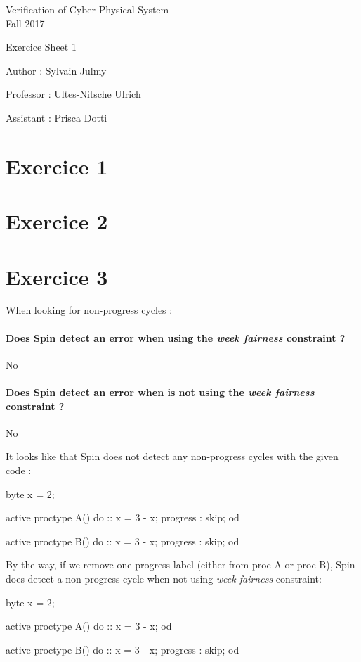 \documentclass[a4paper,11pt]{report}
\author{Sylvain Julmy}
\date{\today}
\begin{document}
\begin{center}
\Large{
    Verification of Cyber-Physical System\\
    Fall 2017
  }
  
  \noindent\makebox[\linewidth]{\rule{\linewidth}{0.4pt}}
  Exercice Sheet 1

  \vspace*{1.4cm}

  Author : Sylvain Julmy
  \noindent\makebox[\linewidth]{\rule{\linewidth}{0.4pt}}

  \begin{flushleft}
    Professor : Ultes-Nitsche Ulrich
    
    Assistant : Prisca Dotti
  \end{flushleft}

  \noindent\makebox[\linewidth]{\rule{\textwidth}{1pt}}
\end{center}

\section*{Exercice 1}
\section*{Exercice 2}
\section*{Exercice 3}

When looking for non-progress cycles :

\paragraph*{Does Spin detect an error when using the \textit{week fairness}
  constraint ?} No

\paragraph*{Does Spin detect an error when is not using the \textit{week
    fairness} constraint ?} No

It looks like that Spin does not detect any non-progress cycles with the given
code :

\begin{promelacode}
byte x = 2;

active proctype A(){
       do
          :: x = 3 - x; progress : skip;
       od
}

active proctype B(){
       do
          :: x = 3 - x; progress : skip;
       od
}
\end{promelacode}

By the way, if we remove one progress label (either from proc A or proc
B), Spin does detect a non-progress cycle when not using \textit{week fairness}
constraint:

\begin{promelacode}
byte x = 2;

active proctype A(){
       do
          :: x = 3 - x;
       od
}

active proctype B(){
       do
          :: x = 3 - x; progress : skip;
       od
}
\end{promelacode}
\end{document}
